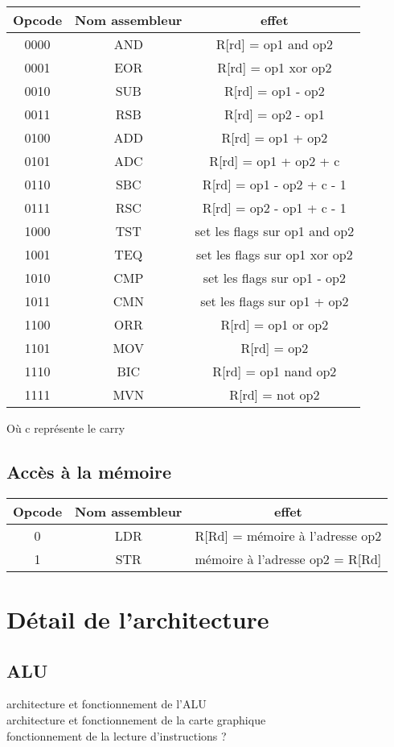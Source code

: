 \documentclass[a4paper]{article}
\begin{document}
\begin{tabular}{|c|c|c|}
  \hline
  Opcode & Nom assembleur & effet \\
  \hline
  0000 & AND & R[rd] = op1 and op2\\
  0001 & EOR & R[rd] = op1 xor op2\\
  0010 & SUB & R[rd] = op1 - op2\\
  0011 & RSB & R[rd] = op2 - op1\\
  0100 & ADD & R[rd] = op1 + op2\\
  0101 & ADC & R[rd] = op1 + op2 + c\\
  0110 & SBC & R[rd] = op1 - op2 + c - 1\\
  0111 & RSC & R[rd] = op2 - op1 + c - 1\\
  1000 & TST & set les flags sur op1 and op2\\
  1001 & TEQ & set les flags sur op1 xor op2\\
  1010 & CMP & set les flags sur op1 - op2\\
  1011 & CMN & set les flags sur op1 + op2\\
  1100 & ORR & R[rd] = op1 or op2\\
  1101 & MOV & R[rd] = op2\\
  1110 & BIC & R[rd] = op1 nand op2\\
  1111 & MVN & R[rd] = not op2\\
  \hline
\end{tabular}

Où c représente le carry

\subsection{Accès à la mémoire}

\begin{tabular}{|c|c|c|}
  \hline
  Opcode & Nom assembleur & effet\\
  \hline
  0 & LDR & R[Rd] = mémoire à l'adresse op2\\
  1 & STR & mémoire à l'adresse op2 = R[Rd]\\
  \hline

\end{tabular}

\section{Détail de l'architecture}

\subsection{ALU}



architecture et fonctionnement de l'ALU\\
architecture et fonctionnement de la carte graphique\\
fonctionnement de la lecture d'instructions ?
\end{document}
